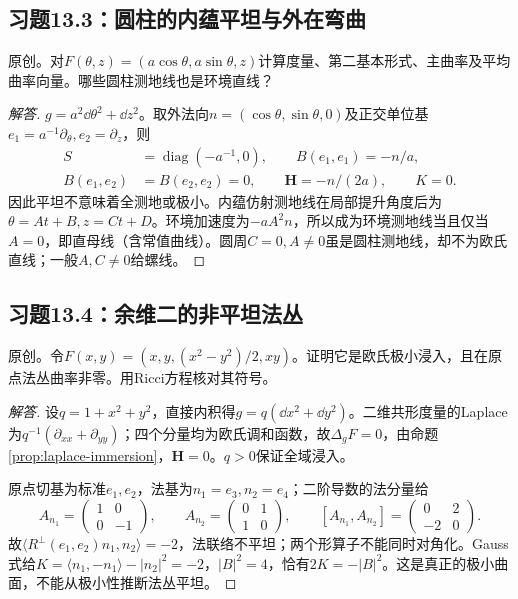 \subsection*{习题13.3：圆柱的内蕴平坦与外在弯曲}
原创。对$F(\theta,z)=(a\cos\theta,a\sin\theta,z)$计算度量、第二基本形式、主曲率及平均曲率向量。哪些圆柱测地线也是环境直线？
\begin{proof}[解答]
$g=a^2\dd\theta^2+\dd z^2$。取外法向$n=(\cos\theta,\sin\theta,0)$及正交单位基$e_1=a^{-1}\partial_\theta,e_2=\partial_z$，则
\begin{align*}
 S&=\operatorname{diag}(-a^{-1},0),\qquad B(e_1,e_1)=-n/a,\\
 B(e_1,e_2)&=B(e_2,e_2)=0,\qquad\mathbf H=-n/(2a),\qquad K=0.
\end{align*}
因此平坦不意味着全测地或极小。内蕴仿射测地线在局部提升角度后为$\theta=At+B,z=Ct+D$。环境加速度为$-aA^2n$，所以成为环境测地线当且仅当$A=0$，即直母线（含常值曲线）。圆周$C=0,A\ne0$虽是圆柱测地线，却不为欧氏直线；一般$A,C\ne0$给螺线。
\end{proof}

\subsection*{习题13.4：余维二的非平坦法丛}
原创。令$F(x,y)=(x,y,(x^2-y^2)/2,xy)$。证明它是欧氏极小浸入，且在原点法丛曲率非零。用Ricci方程核对其符号。
\begin{proof}[解答]
设$q=1+x^2+y^2$，直接内积得$g=q(\dd x^2+\dd y^2)$。二维共形度量的Laplace为$q^{-1}(\partial_{xx}+\partial_{yy})$；四个分量均为欧氏调和函数，故$\Delta_gF=0$，由命题\ref{prop:laplace-immersion}，$\mathbf H=0$。$q>0$保证全域浸入。

原点切基为标准$e_1,e_2$，法基为$n_1=e_3,n_2=e_4$；二阶导数的法分量给
\[
 A_{n_1}=\begin{pmatrix}1&0\\0&-1\end{pmatrix},\qquad
 A_{n_2}=\begin{pmatrix}0&1\\1&0\end{pmatrix},\qquad
 [A_{n_1},A_{n_2}]=\begin{pmatrix}0&2\\-2&0\end{pmatrix}.
\]
故$\langle R^\perp(e_1,e_2)n_1,n_2\rangle=-2$，法联络不平坦；两个形算子不能同时对角化。Gauss式给$K=\langle n_1,-n_1\rangle-|n_2|^2=-2$，$|B|^2=4$，恰有$2K=-|B|^2$。这是真正的极小曲面，不能从极小性推断法丛平坦。
\end{proof}

